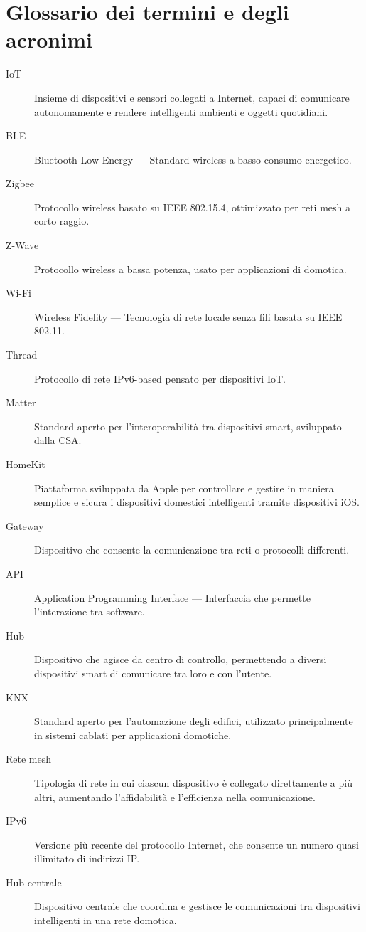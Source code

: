 \chapter{Glossario dei termini e degli acronimi}
\begin{description}
    \item[IoT] Insieme di dispositivi e sensori collegati a Internet, capaci di comunicare autonomamente e rendere intelligenti ambienti e oggetti quotidiani.
    \item[BLE] Bluetooth Low Energy --- Standard wireless a basso consumo energetico.
    \item[Zigbee] Protocollo wireless basato su IEEE 802.15.4, ottimizzato per reti mesh a corto raggio.
    \item[Z-Wave] Protocollo wireless a bassa potenza, usato per applicazioni di domotica.
    \item[Wi-Fi] Wireless Fidelity --- Tecnologia di rete locale senza fili basata su IEEE 802.11.
    \item[Thread] Protocollo di rete IPv6-based pensato per dispositivi IoT.
    \item[Matter] Standard aperto per l'interoperabilità tra dispositivi smart, sviluppato dalla CSA.
    \item[HomeKit] Piattaforma sviluppata da Apple per controllare e gestire in maniera semplice e sicura i dispositivi domestici intelligenti tramite dispositivi iOS.
    \item[Gateway] Dispositivo che consente la comunicazione tra reti o protocolli differenti.
    \item[API] Application Programming Interface --- Interfaccia che permette l'interazione tra software.
    \item[Hub] Dispositivo che agisce da centro di controllo, permettendo a diversi dispositivi smart di comunicare tra loro e con l'utente.
    \item[KNX] Standard aperto per l'automazione degli edifici, utilizzato principalmente in sistemi cablati per applicazioni domotiche.
    \item[Rete mesh] Tipologia di rete in cui ciascun dispositivo è collegato direttamente a più altri, aumentando l'affidabilità e l'efficienza nella comunicazione.
    \item[IPv6] Versione più recente del protocollo Internet, che consente un numero quasi illimitato di indirizzi IP.
    \item[Hub centrale] Dispositivo centrale che coordina e gestisce le comunicazioni tra dispositivi intelligenti in una rete domotica.

\end{description}
